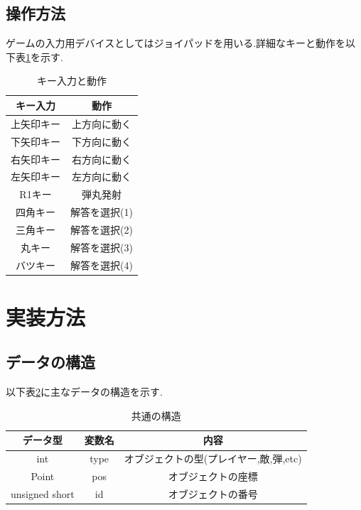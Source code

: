 \documentclass{jarticle}
\begin{document}
\subsection{操作方法}
ゲームの入力用デバイスとしてはジョイパッドを用いる.詳細なキーと動作を以下表\ref{table:inputdevice}を示す.

\begin{table}[H]
\caption{キー入力と動作}
	\begin{center}
		\begin{tabular}{|c|c|}\hline \hline
		キー入力 & 動作 \\ \hline
		上矢印キー & 上方向に動く \\ 
		下矢印キー & 下方向に動く \\ 
		右矢印キー & 右方向に動く \\ 
		左矢印キー & 左方向に動く \\ 
		R1キー　& 弾丸発射 \\
		四角キー & 解答を選択(1) \\ 
		三角キー & 解答を選択(2) \\
		丸キー　& 解答を選択(3) \\
		バツキー & 解答を選択(4) \\ \hline
		\end{tabular}
	\end{center}
\label{table:inputdevice} 
\end{table}

\section{実装方法}
\subsection{データの構造}
以下表\ref{table:data}に主なデータの構造を示す.

\begin{table}[H]
\caption{共通の構造}
	\begin{center}
		\begin{tabular}{|c|c|c|}\hline 
		データ型& 変数名 & 内容 \\ \hline
		int & type &オブジェクトの型(プレイヤー,敵,弾,etc) \\ 
		Point &pos & オブジェクトの座標 \\
		unsigned short & id & オブジェクトの番号 \\ 
		\hline
		\end{tabular}
	\end{center}
\label{table:data} 
\end{table}
\end{document}
